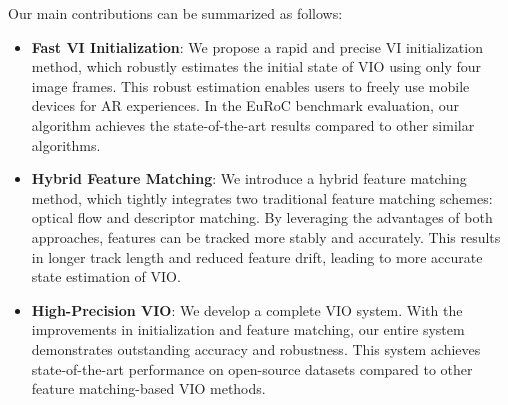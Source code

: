 Our main contributions can be summarized as follows:
\begin{itemize}
\item \textbf{Fast VI Initialization}: We propose a rapid and precise VI initialization method, which robustly estimates the initial state of VIO using only four image frames. This robust estimation enables users to freely use mobile devices for AR experiences. In the EuRoC \cite{Burri25012016-EuRoC} benchmark evaluation, our algorithm achieves the state-of-the-art results compared to other similar algorithms.

\item \textbf{Hybrid Feature Matching}: We introduce a hybrid feature matching method, which tightly integrates two traditional feature matching schemes: optical flow and descriptor matching. By leveraging the advantages of both approaches, features can be tracked more stably and accurately. This results in longer track length and reduced feature drift, leading to more accurate state estimation of VIO.

\item \textbf{High-Precision VIO}: We develop a complete VIO system. With the improvements in initialization and feature matching, our entire system demonstrates outstanding accuracy and robustness. This system achieves state-of-the-art performance on open-source datasets compared to other feature matching-based VIO methods.
\end{itemize}